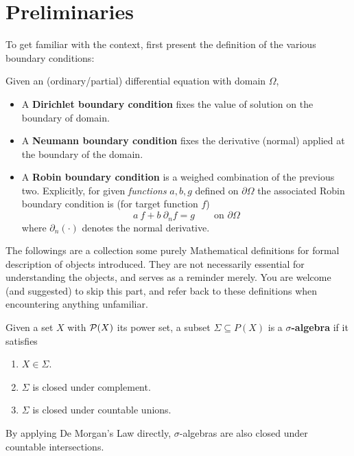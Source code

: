 \documentclass[10pt]{article}
\begin{document}

\tableofcontents
\clearpage

\section{Preliminaries}

\textstart
To get familiar with the context, first present the definition of the various boundary conditions:

\begin{definition}
    Given an (ordinary/partial) differential equation with domain $\Omega$,
    \begin{itemize}
        \item A \textbf{Dirichlet boundary condition} fixes the value of solution on the boundary of domain. 
        \item A \textbf{Neumann boundary condition} fixes the derivative (normal) applied at the boundary of the domain.
        \item A \textbf{Robin boundary condition} is a weighed combination of the previous two. Explicitly, for given \emph{functions} $a, b, g$ defined on $\partial \Omega$ the associated Robin boundary condition is (for target function $f$)
        \[
            a\ f + b\ \partial_n f = g \qquad \text{on $\partial \Omega$}
        \]
        where $\partial_n(\cdot)$ denotes the normal derivative.
    \end{itemize}
\end{definition}

\textstart
The followings are a collection some purely Mathematical definitions for formal description of objects introduced. They are not necessarily essential for understanding the objects, and serves as a reminder merely. You are welcome (and suggested) to skip this part, and refer back to these definitions when encountering anything unfamiliar.

\begin{definition}
    Given a set $X$ with $\P(X)$ its power set, a subset $\Sigma \subseteq P(X)$ is a \textbf{$\sigma$-algebra} if it satisfies
    \begin{enumerate}[label=\arabic*)]
        \item $X \in \Sigma$.
        \item $\Sigma$ is closed under complement.
        \item $\Sigma$ is closed under countable unions.
    \end{enumerate}
\end{definition}
\nogap
\begin{remark}
    By applying De Morgan's Law directly, $\sigma$-algebras are also closed under countable intersections.
\end{remark}
\end{document}
